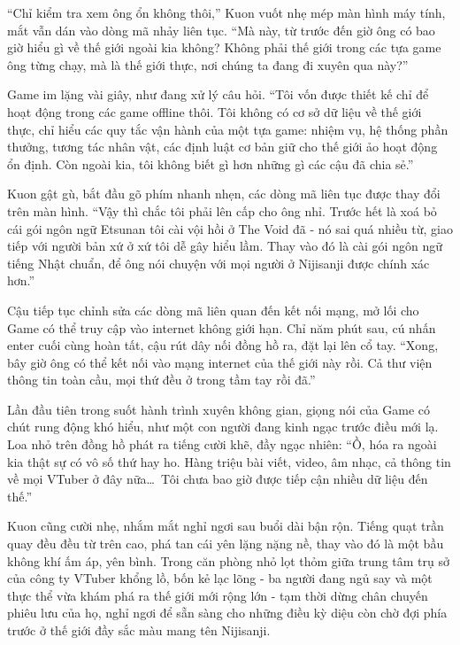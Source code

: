 \documentclass[../main.tex]{subfiles}
\begin{document}
``Chỉ kiểm tra xem ông ổn không thôi,'' Kuon vuốt nhẹ mép màn hình máy tính, mắt vẫn dán vào dòng mã nhảy liên tục. ``Mà này, từ trước đến giờ ông có bao giờ hiểu gì về thế giới ngoài kia không? Không phải thế giới trong các tựa game ông từng chạy, mà là thế giới thực, nơi chúng ta đang đi xuyên qua này?''

Game im lặng vài giây, như đang xử lý câu hỏi. ``Tôi vốn được thiết kế chỉ để hoạt động trong các game offline thôi. Tôi không có cơ sở dữ liệu về thế giới thực, chỉ hiểu các quy tắc vận hành của một tựa game: nhiệm vụ, hệ thống phần thưởng, tương tác nhân vật, các định luật cơ bản giữ cho thế giới ảo hoạt động ổn định. Còn ngoài kia, tôi không biết gì hơn những gì các cậu đã chia sẻ.''

Kuon gật gù, bắt đầu gõ phím nhanh nhẹn, các dòng mã liên tục được thay đổi trên màn hình. ``Vậy thì chắc tôi phải lên cấp cho ông nhỉ. Trước hết là xoá bỏ cái gói ngôn ngữ Etsunan tôi cài vội hồi ở The Void đã - nó sai quá nhiều từ, giao tiếp với người bản xứ ở xứ tôi dễ gây hiểu lầm. Thay vào đó là cài gói ngôn ngữ tiếng Nhật chuẩn, để ông nói chuyện với mọi người ở Nijisanji được chính xác hơn.''

Cậu tiếp tục chỉnh sửa các dòng mã liên quan đến kết nối mạng, mở lối cho Game có thể truy cập vào internet không giới hạn. Chỉ năm phút sau, cú nhấn enter cuối cùng hoàn tất, cậu rút dây nối đồng hồ ra, đặt lại lên cổ tay. ``Xong, bây giờ ông có thể kết nối vào mạng internet của thế giới này rồi. Cả thư viện thông tin toàn cầu, mọi thứ đều ở trong tầm tay rồi đã.''

Lần đầu tiên trong suốt hành trình xuyên không gian, giọng nói của Game có chút rung động khó hiểu, như một con người đang kinh ngạc trước điều mới lạ. Loa nhỏ trên đồng hồ phát ra tiếng cười khẽ, đầy ngạc nhiên: ``Ồ, hóa ra ngoài kia thật sự có vô số thứ hay ho. Hàng triệu bài viết, video, âm nhạc, cả thông tin về mọi VTuber ở đây nữa\dots\ Tôi chưa bao giờ được tiếp cận nhiều dữ liệu đến thế.''

Kuon cũng cười nhẹ, nhắm mắt nghỉ ngơi sau buổi dài bận rộn. Tiếng quạt trần quay đều đều từ trên cao, phá tan cái yên lặng nặng nề, thay vào đó là một bầu không khí ấm áp, yên bình. Trong căn phòng nhỏ lọt thỏm giữa trung tâm trụ sở của công ty VTuber khổng lồ, bốn kẻ lạc lõng - ba người đang ngủ say và một thực thể vừa khám phá ra thế giới mới rộng lớn - tạm thời dừng chân chuyến phiêu lưu của họ, nghỉ ngơi để sẵn sàng cho những điều kỳ diệu còn chờ đợi phía trước ở thế giới đầy sắc màu mang tên Nijisanji.
\end{document}
